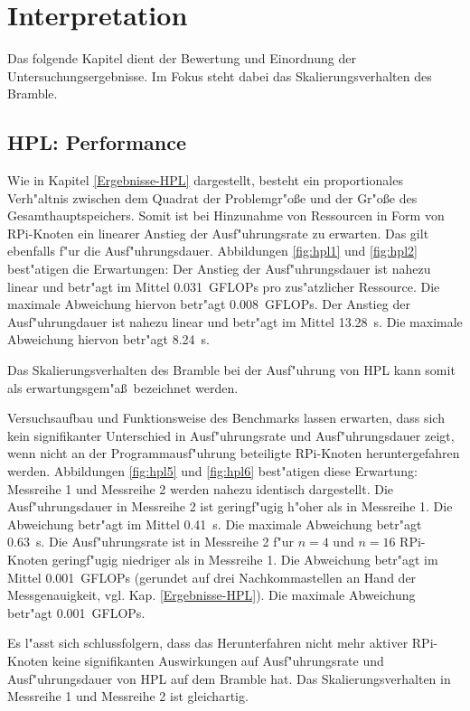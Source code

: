 \chapter{Interpretation}\label{Kap4}

Das folgende Kapitel dient der Bewertung und Einordnung der Untersuchungsergebnisse. Im Fokus steht dabei das Skalierungsverhalten des Bramble.    

\section{HPL: Performance}\label{Interpretation-Linpack}
Wie in Kapitel \ref{Ergebnisse-HPL} dargestellt, besteht ein proportionales Verh"altnis zwischen dem Quadrat der Problemgr"o\ss e und der Gr"o\ss e des Gesamthauptspeichers. Somit ist bei Hinzunahme von Ressourcen in Form von RPi-Knoten ein linearer Anstieg der Ausf"uhrungsrate zu erwarten. Das gilt ebenfalls f"ur die Ausf"uhrungsdauer. Abbildungen \ref{fig:hpl1} und \ref{fig:hpl2} best"atigen die Erwartungen: Der Anstieg der Ausf"uhrungsdauer ist nahezu linear und betr"agt im Mittel 0.031~GFLOPs pro zus"atzlicher Ressource. Die maximale Abweichung hiervon betr"agt 0.008~GFLOPs. Der Anstieg der Ausf"uhrungdauer ist nahezu linear und betr"agt im Mittel 13.28~s. Die maximale Abweichung hiervon betr"agt 8.24~s.

Das Skalierungsverhalten des Bramble bei der Ausf"uhrung von HPL kann somit als erwartungsgem"a\ss\ bezeichnet werden.

Versuchsaufbau und Funktionsweise des Benchmarks lassen erwarten, dass sich kein signifikanter Unterschied in Ausf"uhrungsrate und Ausf"uhrungsdauer zeigt, wenn nicht an der Programmausf"uhrung beteiligte RPi-Knoten heruntergefahren werden. Abbildungen \ref{fig:hpl5} und \ref{fig:hpl6} best"atigen diese Erwartung: Messreihe 1 und Messreihe 2 werden nahezu identisch dargestellt. Die Ausf"uhrungsdauer in Messreihe 2 ist geringf"ugig h"oher als in Messreihe 1. Die Abweichung betr"agt im Mittel 0.41~s. Die maximale Abweichung betr"agt 0.63~s. Die Ausf"uhrungsrate ist in Messreihe 2 f"ur $n=4$ und $n=16$ RPi-Knoten geringf"ugig niedriger als in Messreihe 1. Die Abweichung betr"agt im Mittel 0.001~GFLOPs (gerundet auf drei Nachkommastellen an Hand der Messgenauigkeit, vgl. Kap. \ref{Ergebnisse-HPL}). Die maximale Abweichung betr"agt 0.001~GFLOPs. 

Es l"asst sich schlussfolgern, dass das Herunterfahren nicht mehr aktiver RPi-Knoten keine signifikanten Auswirkungen auf Ausf"uhrungsrate und Ausf"uhrungsdauer von HPL auf dem Bramble hat. Das Skalierungsverhalten in Messreihe 1 und Messreihe 2 ist gleichartig. 
\newpage
